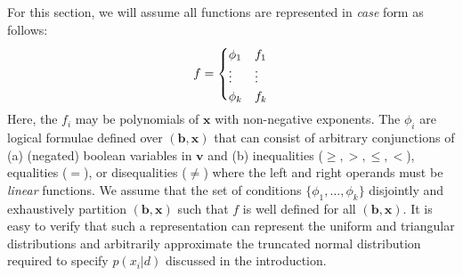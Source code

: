 \documentclass[letterpaper]{article}
\renewcommand{\vec}[1]{\mathbf{#1}}
\begin{document}
{For this section, we will assume all functions
are represented in \emph{case} form as follows:
\vspace{-1mm}
{%
\begin{align}
f = 
\begin{cases}
  \phi_1 & f_1 \\ 
  \vdots & \vdots \\ 
  \phi_k & f_k \\ 
  \vspace{-6mm}
\end{cases} \label{eq:case}
\end{align}
} 
Here, the $f_i$ may be polynomials of $\vec{x}$ with non-negative
exponents.  The $\phi_i$ are logical formulae defined over
$(\vec{b},\vec{x})$ that can consist of arbitrary conjunctions of (a)
(negated) boolean variables in $\vec{v}$ and (b) inequalities
($\geq,>,\leq,<$), equalities ($=$), or disequalities ($\neq$) where
the left and right operands must be \emph{linear} functions.  We
assume that the set of conditions $\{ \phi_1,\ldots,\phi_k \}$ 
disjointly and exhaustively partition $(\vec{b},\vec{x})$ such that $f$
is well defined for all $(\vec{b},\vec{x})$.  It is easy to verify
that such a representation can represent the uniform and triangular
distributions and arbitrarily approximate the truncated normal 
distribution required to specify $p(x_i|d)$ discussed in 
the introduction.


}
\end{document}
